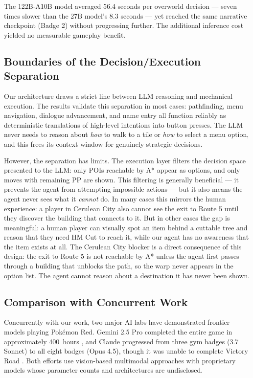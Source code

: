 \documentclass{article}
\begin{document}
The 122B-A10B model averaged 56.4 seconds per overworld decision --- seven times slower than the 27B model's 8.3 seconds --- yet reached the same narrative checkpoint (Badge 2) without progressing further. The additional inference cost yielded no measurable gameplay benefit.

\subsection{Boundaries of the Decision/Execution Separation}

Our architecture draws a strict line between LLM reasoning and mechanical execution. The results validate this separation in most cases: pathfinding, menu navigation, dialogue advancement, and name entry all function reliably as deterministic translations of high-level intentions into button presses. The LLM never needs to reason about \emph{how} to walk to a tile or \emph{how} to select a menu option, and this frees its context window for genuinely strategic decisions.

However, the separation has limits. The execution layer filters the decision space presented to the LLM: only POIs reachable by A* appear as options, and only moves with remaining PP are shown. This filtering is generally beneficial --- it prevents the agent from attempting impossible actions --- but it also means the agent never sees what it \emph{cannot} do. In many cases this mirrors the human experience: a player in Cerulean City also cannot see the exit to Route 5 until they discover the building that connects to it. But in other cases the gap is meaningful: a human player can visually spot an item behind a cuttable tree and reason that they need HM Cut to reach it, while our agent has no awareness that the item exists at all. The Cerulean City blocker is a direct consequence of this design: the exit to Route 5 is not reachable by A* unless the agent first passes through a building that unblocks the path, so the warp never appears in the option list. The agent cannot reason about a destination it has never been shown.

\subsection{Comparison with Concurrent Work}

Concurrently with our work, two major AI labs have demonstrated frontier models playing Pok\'{e}mon Red. Gemini 2.5 Pro completed the entire game in approximately 400~hours \citep{gemini25}, and Claude progressed from three gym badges (3.7 Sonnet) to all eight badges (Opus 4.5), though it was unable to complete Victory Road \citep{anthropic2025pokemon}. Both efforts use vision-based multimodal approaches with proprietary models whose parameter counts and architectures are undisclosed.
\end{document}
